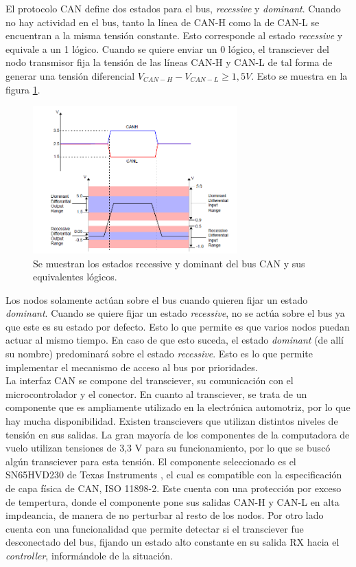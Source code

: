 El protocolo CAN define dos estados para el bus, \textit{recessive} y \textit{dominant}. Cuando no hay actividad en el bus, tanto la línea de CAN-H como la de CAN-L se encuentran a la misma tensión constante. Esto corresponde al estado \textit{recessive} y equivale a un 1 lógico. Cuando se quiere enviar un 0 lógico, el transciever del nodo transmisor fija la tensión de las líneas CAN-H y CAN-L de tal forma de generar una tensión diferencial $V_{CAN-H} - V_{CAN-L} \geq 1,5 V$. Esto se muestra en la figura \ref{fig:CAN_recessive_dominant}.

\begin{figure}[H]
    \centering
    \includegraphics[width=0.7\textwidth]{img/CAN_recessive_dominant.png}
    \caption{Se muestran los estados recessive y dominant del bus CAN y sus equivalentes lógicos.}
    \label{fig:CAN_recessive_dominant}    
\end{figure}

Los nodos solamente actúan sobre el bus cuando quieren fijar un estado \textit{dominant}. Cuando se quiere fijar un estado \textit{recessive}, no se actúa sobre el bus ya que este es su estado por defecto. Esto lo que permite es que varios nodos puedan actuar al mismo tiempo. En caso de que esto suceda, el estado \textit{dominant} (de allí su nombre) predominará sobre el estado \textit{recessive}. Esto es lo que permite implementar el mecanismo de acceso al bus por prioridades.\\

La interfaz CAN se compone del transciever, su comunicación con el microcontrolador y el conector. En cuanto al transciever, se trata de un componente que es ampliamente utilizado en la electrónica automotriz, por lo que hay mucha disponibilidad. Existen transcievers que utilizan distintos niveles de tensión en sus salidas. La gran mayoría de los componentes de la computadora de vuelo utilizan tensiones de 3,3 V para su funcionamiento, por lo que se buscó algún transciever para esta tensión. El componente seleccionado es el SN65HVD230 de Texas Instruments \cite{SN65VHD230}, el cual es compatible con la especificación de capa física de CAN, ISO 11898-2. Este cuenta con una protección por exceso de tempertura, donde el componente pone sus salidas CAN-H y CAN-L en alta impdeancia, de manera de no perturbar al resto de los nodos. Por otro lado cuenta con una funcionalidad que permite detectar si el transciever fue desconectado del bus, fijando un estado alto constante en su salida RX hacia el \textit{controller}, informándole de la situación.\\

